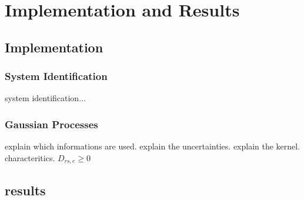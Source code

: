 \chapter{Implementation and Results}
\label{cha:impres}

\section{Implementation}
\label{sec:implementation}

\subsection{System Identification}
system identification...

\subsection{Gaussian Processes}
explain which informations are used.
explain the uncertainties.
explain the kernel. characteritics. $D_{rs,e} \geq 0$


\section{results}
\label{sec:results}



